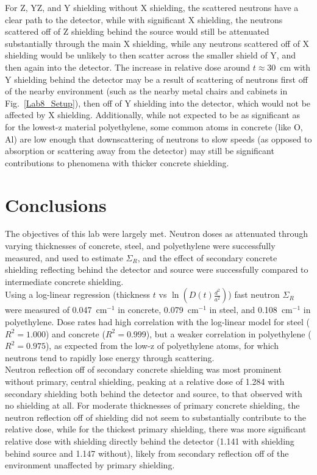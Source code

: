 \documentclass[12pt]{article}
\newcommand{\figref}[1]{Fig.~\ref{#1}}
\newcommand{\XSr}{\Sigma_R}
\newcommand{\incm}{$\mathrm{cm^{-1}}$\xspace}
\begin{document}
For Z, YZ, and Y shielding without X shielding, the scattered neutrons have a clear path to the detector, while with significant X shielding, the neutrons scattered off of Z shielding behind the source would still be attenuated substantially through the main X shielding, while any neutrons scattered off of X shielding would be unlikely to then scatter across the smaller shield of Y, and then again into the detector.
The increase in relative dose around $t\approx30$~cm with Y shielding behind the detector may be a result of scattering of neutrons first off of the nearby environment (such as the nearby metal chairs and cabinets in \figref{Lab8_Setup}), then off of Y shielding into the detector, which would not be affected by X shielding.
Additionally, while not expected to be as significant as for the lowest-z material polyethylene, some common atoms in concrete (like O, Al) are low enough that downscattering of neutrons to slow speeds (as opposed to absorption or scattering away from the detector) may still be significant contributions to phenomena with thicker concrete shielding.
\section{Conclusions}\label{sec:conc}

The objectives of this lab were largely met.
Neutron doses as attenuated through varying thicknesses of concrete, steel, and polyethylene were successfully measured, and used to estimate $\XSr$, and the effect of secondary concrete shielding reflecting behind the detector and source were successfully compared to intermediate concrete shielding.\\

Using a log-linear regression (thickness $t$ vs $\ln(D(t)\frac{d^2}{a^2})$) fast neutron $\XSr$ were measured of 0.047~\incm in concrete, 0.079~\incm in steel, and 0.108~\incm in polyethylene.
Dose rates had high correlation with the log-linear model for steel ($R^2=1.000$) and concrete ($R^2=0.999$), but a weaker correlation in polyethylene ($R^2=0.975$), as expected from the low-z of polyethylene atoms, for which neutrons tend to rapidly lose energy through scattering.\\

Neutron reflection off of secondary concrete shielding was most prominent without primary, central shielding, peaking at a relative dose of 1.284 with secondary shielding both behind the detector and source, to that observed with no shielding at all.
For moderate thicknesses of primary concrete shielding, the neutron reflection off of shielding did not seem to substantially contribute to the relative dose, while for the thickest primary shielding, there was more significant relative dose with shielding directly behind the detector (1.141 with shielding behind source and 1.147 without), likely from secondary reflection off of the environment unaffected by primary shielding.\\
\end{document}
